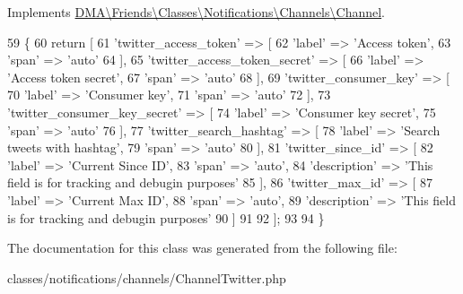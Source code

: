 Implements \hyperlink{interfaceDMA_1_1Friends_1_1Classes_1_1Notifications_1_1Channels_1_1Channel_aa473115fa58a6fa5f57a9069f23dd771}{D\+M\+A\textbackslash{}\+Friends\textbackslash{}\+Classes\textbackslash{}\+Notifications\textbackslash{}\+Channels\textbackslash{}\+Channel}.


\begin{DoxyCode}
59     \{
60         \textcolor{keywordflow}{return} [
61             \textcolor{stringliteral}{'twitter\_access\_token'} => [
62                 \textcolor{stringliteral}{'label'} => \textcolor{stringliteral}{'Access token'},
63                 \textcolor{stringliteral}{'span'}  => \textcolor{stringliteral}{'auto'}
64             ],
65             \textcolor{stringliteral}{'twitter\_access\_token\_secret'} => [
66                 \textcolor{stringliteral}{'label'} => \textcolor{stringliteral}{'Access token secret'},
67                 \textcolor{stringliteral}{'span'}  => \textcolor{stringliteral}{'auto'}
68             ],
69             \textcolor{stringliteral}{'twitter\_consumer\_key'} => [
70                 \textcolor{stringliteral}{'label'} => \textcolor{stringliteral}{'Consumer key'},
71                 \textcolor{stringliteral}{'span'}  => \textcolor{stringliteral}{'auto'}
72             ],
73             \textcolor{stringliteral}{'twitter\_consumer\_key\_secret'} => [
74                 \textcolor{stringliteral}{'label'} => \textcolor{stringliteral}{'Consumer key secret'},
75                 \textcolor{stringliteral}{'span'}  => \textcolor{stringliteral}{'auto'}
76             ],
77             \textcolor{stringliteral}{'twitter\_search\_hashtag'} => [
78                 \textcolor{stringliteral}{'label'} => \textcolor{stringliteral}{'Search tweets with hashtag'},
79                 \textcolor{stringliteral}{'span'}  => \textcolor{stringliteral}{'auto'}
80             ],
81             \textcolor{stringliteral}{'twitter\_since\_id'} => [
82                 \textcolor{stringliteral}{'label'} => \textcolor{stringliteral}{'Current Since ID'},
83                 \textcolor{stringliteral}{'span'}  => \textcolor{stringliteral}{'auto'},
84                 \textcolor{stringliteral}{'description'} => \textcolor{stringliteral}{'This field is for tracking and debugin purposes'}
85             ],
86             \textcolor{stringliteral}{'twitter\_max\_id'} => [
87                 \textcolor{stringliteral}{'label'} => \textcolor{stringliteral}{'Current Max ID'},
88                 \textcolor{stringliteral}{'span'}  => \textcolor{stringliteral}{'auto'},
89                 \textcolor{stringliteral}{'description'} => \textcolor{stringliteral}{'This field is for tracking and debugin purposes'}
90             ]
91 
92         ];
93 
94     \}
\end{DoxyCode}


The documentation for this class was generated from the following file\+:\begin{DoxyCompactItemize}
\item 
classes/notifications/channels/Channel\+Twitter.\+php\end{DoxyCompactItemize}
